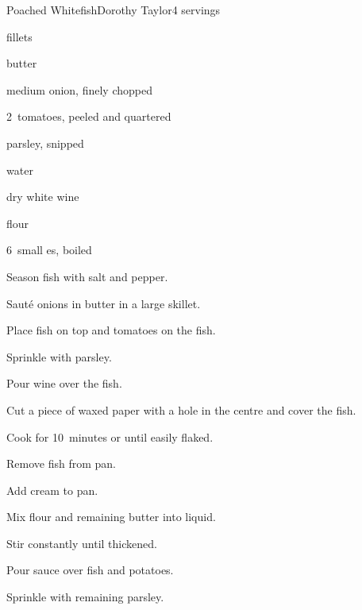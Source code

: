 \begin{recipe}{Poached Whitefish}{Dorothy Taylor}{4 servings}

\begin{ingredients}
\item \lbs{1\threequarter}  fillets
\item {}
\item {}
\item {} butter
\item medium onion, finely chopped
\item 2~tomatoes, peeled and quartered
\item \C{\quarter} parsley, snipped
\item \C{\third} water
\item \C{\third} dry white wine
\item \C{\third} 
\item {} flour
\item 6~small es, boiled
\end{ingredients}

\begin{directions}
\item Season fish with salt and pepper.
\item Saut\'e onions in  butter in a large skillet.
\item Place fish on top and tomatoes on the fish.
\item Sprinkle with  parsley.
\item Pour wine over the fish.
\item Cut a piece of waxed paper with a hole in the centre and cover the fish.
\item Cook for 10~minutes or until easily flaked.
\item Remove fish from pan.
\item Add cream to pan.
\item Mix flour and remaining butter into liquid.
\item Stir constantly until thickened.
\item Pour sauce over fish and potatoes.
\item Sprinkle with remaining parsley.
\end{directions}

\end{recipe}
